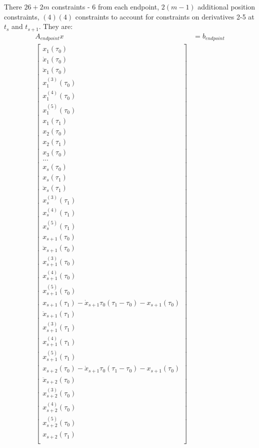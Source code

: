 \documentclass[11pt]{article}
\begin{document}
There $26+2m$ constraints - 6 from each endpoint, $2(m-1)$ additional position constraints, $(4)(4)$ constraints to account for constraints on derivatives 2-5 at $t_{s}$ and $t_{s+1}$.  They are: 
\begin{align}
\nonumber A_{endpoint} x &= b_{endpoint} \\
\label{eqn: endpoint} \begin{bmatrix}
x_1(\tau_0) \\
\dot{x}_1 (\tau_0) \\
\ddot{x}_1 (\tau_0) \\
x^{(3)}_1 (\tau_0) \\
x^{(4)}_1 (\tau_0) \\
x^{(5)}_1 (\tau_0) \\
x_1 (\tau_1) \\
x_2 (\tau_0) \\
x_2 (\tau_1) \\
x_3 (\tau_0) \\ 
... \\
x_{s} (\tau_0) \\
x_{s} (\tau_1) \\
\ddot{x}_{s} (\tau_1) \\
x^{(3)}_{s} (\tau_1) \\
x^{(4)}_{s} (\tau_1) \\
x^{(5)}_{s} (\tau_1) \\
x_{s+1} (\tau_0) \\
\ddot{x}_{s+1} (\tau_0) \\
x^{(3)}_{s+1} (\tau_0) \\
x^{(4)}_{s+1} (\tau_0) \\
x^{(5)}_{s+1} (\tau_0) \\
x_{s+1} (\tau_1) - \dot{x}_{s+1}{\tau_0}(\tau_1-\tau_0) - x_{s+1}(\tau_0) \\
\ddot{x}_{s+1} (\tau_1) \\
x^{(3)}_{s+1} (\tau_1) \\
x^{(4)}_{s+1} (\tau_1) \\
x^{(5)}_{s+1} (\tau_1) \\
x_{s+2} (\tau_0) - \dot{x}_{s+1}{\tau_0}(\tau_1-\tau_0) - x_{s+1}(\tau_0)\\
\ddot{x}_{s+2} (\tau_0) \\
x^{(3)}_{s+2} (\tau_0) \\
x^{(4)}_{s+2} (\tau_0) \\
x^{(5)}_{s+2} (\tau_0)  \\
x_{s+2} (\tau_1) \\

\end{bmatrix}
\end{align}
\end{document}
